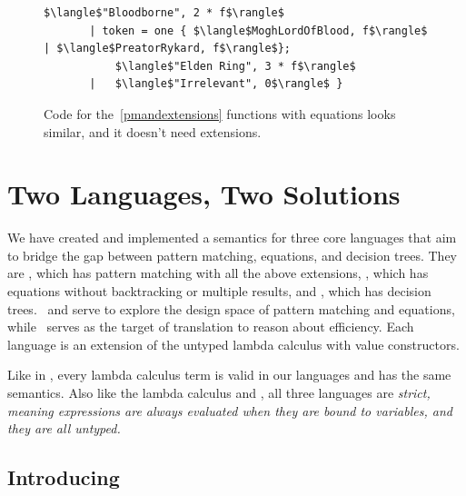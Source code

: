 \documentclass[article,screen,12pt, nonacm]{acmart}
\begin{document}
\begin{figure}[ht]
\begin{minipage}[h]{\linewidth}
\begin{lstlisting}[numbers=none, basicstyle=\tiny, xleftmargin=9em, 
                            frame=single, showstringspaces=false]
           $\langle$"Bloodborne", 2 * f$\rangle$
       | token = one { $\langle$MoghLordOfBlood, f$\rangle$ | $\langle$PreatorRykard, f$\rangle$}; 
           $\langle$"Elden Ring", 3 * f$\rangle$
       |   $\langle$"Irrelevant", 0$\rangle$ }
          \end{lstlisting}
            \label{fig:versegot} 
        \vspace{4ex}
        \end{minipage}%
    \caption{Code for the~\ref{pmandextensions} functions with equations looks
    similar, and it doesn't need extensions.}
    \label{fig:verseextfuncs}
      \end{figure}
        


    \section{Two Languages, Two Solutions}
    We have created and implemented a semantics for three core languages that
    aim to bridge the gap between pattern matching, equations, and decision
    trees. They are \PPlus, which has pattern matching with all the above
    extensions, \VMinus, which has equations without backtracking or multiple
    results, and \D, which has decision trees. \PPlus\ and \VMinus serve to
    explore the design space of pattern matching and equations, while \D\ serves
    as the target of translation to reason about efficiency. Each language is an
    extension of the untyped lambda calculus with value constructors. 
    
    Like in \VC, every lambda calculus term is valid in our languages and has
    the same semantics. Also like the lambda calculus and \VC, all three
    languages are \it{strict}, meaning expressions are always evaluated when
    they are bound to variables, and they are all untyped. 
    

\subsection{Introducing \PPlus}
\label{pplus}
\end{document}
